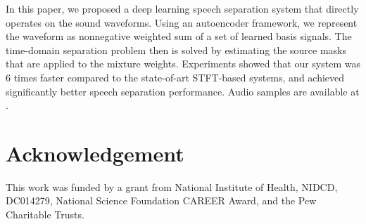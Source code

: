 \documentclass{article}
\begin{document}
In this paper, we proposed a deep learning speech separation system that directly operates on the sound waveforms. Using an autoencoder framework, we represent the waveform as nonnegative weighted sum of a set of learned basis signals. The time-domain separation problem then is solved by estimating the source masks that are applied to the mixture weights. Experiments showed that our system was 6 times faster compared to the state-of-art STFT-based systems, and achieved significantly better speech separation performance. Audio samples are available at \cite{web2018tasnet}. 
\section{Acknowledgement}
This work was funded by a grant from National Institute of Health, NIDCD, DC014279, National Science Foundation CAREER Award, and the Pew Charitable Trusts.
\vfill\pagebreak


\end{document}
